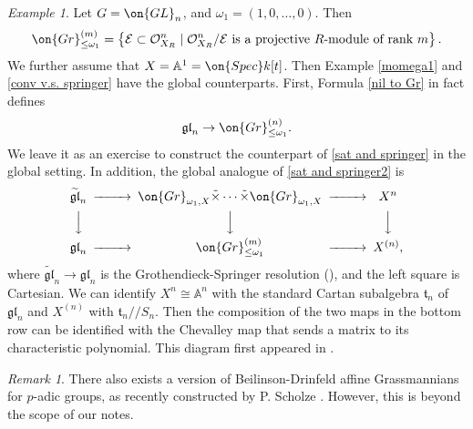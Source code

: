 \documentclass[]{pcmi}
\theoremstyle{plain}
\theoremstyle{remark}
\newtheorem{ex}[equation]{Example}
\newtheorem{rmk}[equation]{Remark}
\theoremstyle{definition}
\newcommand{\frakg}{{\mathfrak g}}
\newcommand{\frakl}{{\mathfrak l}}
\newcommand{\frakt}{{\mathfrak t}}
\newcommand{\bA}{{\mathbb A}}
\newcommand{\mE}{{\mathcal E}}
\newcommand{\mO}{{\mathcal O}}
\newcommand{\Gr}{{\on{Gr}}}
\newcommand{\Spec}{\on{Spec}}
\newcommand{\GL}{{\on{GL}}}
\newcommand{\gl}{{\frakg\frakl}}
\begin{document}
\begin{ex}\label{momega1BD}
Let $G=\GL_n$, and $\omega_1=(1,0,\ldots,0)$. Then
\[\Gr^{(m)}_{\leq \omega_1}=\left\{ \mE\subset \mO_{X_R}^n\mid \mO_{X_R}^n/\mE \mbox{ is a projective } R\mbox{-module of rank } m \right\}.\]
We further assume that $X=\bA^1=\Spec k[t]$. Then Example \ref{momega1} and \ref{conv v.s. springer} have the global counterparts. First, Formula \eqref{nil to Gr} in fact defines
\[\gl_n\to \Gr_{\leq \omega_1}^{(n)}.\]
We leave it as an exercise to construct the counterpart of \eqref{sat and springer} in the global setting. In addition, the global analogue of
\eqref{sat and springer2} is
\[\begin{CD}
\widetilde{\gl}_n@>>> \Gr_{\omega_1,X}\tilde\times\cdots\tilde\times\Gr_{\omega_1,X}@>>> X^n\\
@VVV@VVV@VVV\\
\gl_n@>>>\Gr^{(m)}_{\leq \omega_1}@>>>X^{(n)},
\end{CD}\]
where $\widetilde{\gl}_n\to\gl_n$ is the Grothendieck-Springer resolution (\cite[\S~1]{Yu}), and the left square is Cartesian. We can identify $X^n\cong \bA^n$ with the standard Cartan subalgebra $\frakt_n$ of $\gl_n$ and $X^{(n)}$ with $\frakt_n/\!\!/S_n$. Then the composition of the two maps in the bottom row can be identified with the Chevalley map that sends a matrix to its characteristic polynomial. This diagram first appeared in \cite{MVy}.
\end{ex}

\begin{rmk}
There also exists a version of Beilinson-Drinfeld affine Grassmannians for $p$-adic groups, as recently constructed by P. Scholze \cite{Sch}. However, this is beyond the scope of our notes.
\end{rmk}
\end{document}
